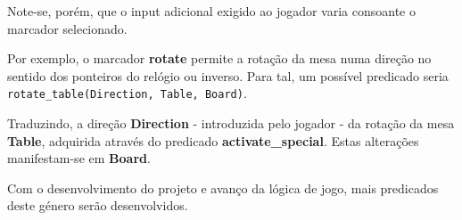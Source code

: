 \documentclass[a4paper]{article}
\begin{document}
Note-se, porém, que o input adicional exigido ao jogador varia consoante o marcador selecionado. \newline

Por exemplo, o marcador \textbf{rotate} permite a rotação da mesa numa direção no sentido dos ponteiros do relógio ou inverso. Para tal, um possível predicado seria \texttt{rotate\_table(Direction, Table, Board)}. 	\newline

Traduzindo, a direção \textbf{Direction} - introduzida pelo jogador - da rotação da mesa \textbf{Table}, adquirida através do predicado \textbf{activate\_special}. Estas alterações manifestam-se em \textbf{Board}. \newline

Com o desenvolvimento do projeto e avanço da lógica de jogo, mais predicados deste género serão desenvolvidos.
\end{document}

